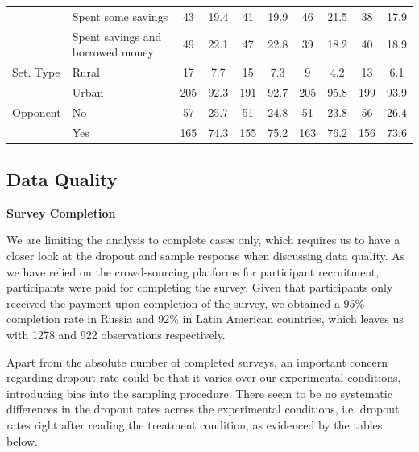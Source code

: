 \documentclass[11pt, ngerman,english,a4]{article}
\begin{document}
\begin{table}[!htbp]
{\begin{tabular}[t]{llcccccccc}
 & Spent some savings & 43 & 19.4 & 41 & 19.9 & 46 & 21.5 & 38 & 17.9\\
 & Spent savings and
borrowed money & 49 & 22.1 & 47 & 22.8 & 39 & 18.2 & 40 & 18.9\\
Set. Type & Rural & 17 & 7.7 & 15 & 7.3 & 9 & 4.2 & 13 & 6.1\\
 & Urban & 205 & 92.3 & 191 & 92.7 & 205 & 95.8 & 199 & 93.9\\
Opponent & No & 57 & 25.7 & 51 & 24.8 & 51 & 23.8 & 56 & 26.4\\
 & Yes & 165 & 74.3 & 155 & 75.2 & 163 & 76.2 & 156 & 73.6\\
\bottomrule
\end{tabular}}
\end{table}

\clearpage
\subsection{Data Quality}

\textbf{Survey Completion}

We are limiting the analysis to complete cases only, which requires us to have a closer look at the dropout and sample response when discussing data quality. As we have relied on the crowd-sourcing platforms for participant recruitment, participants were paid for completing the survey. Given that participants only received the payment upon completion of the survey, we obtained a 95\% completion rate in Russia and 92\% in Latin American countries, which leaves us with 1278 and 922 observations respectively. 

Apart from the absolute number of completed surveys, an important concern regarding dropout rate could be that it varies over our experimental conditions, introducing bias into the sampling procedure. There seem to be no systematic differences in the dropout rates across the experimental conditions, i.e. dropout rates right after reading the treatment condition, as evidenced by the tables below. 
\end{document}
